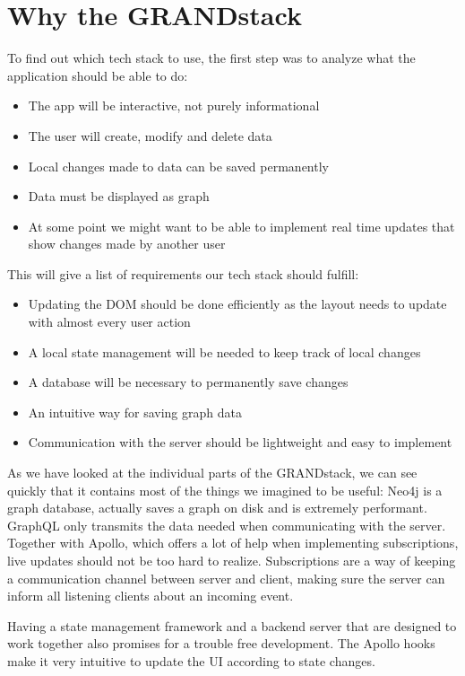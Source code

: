 \section{Why the GRANDstack}
To find out which tech stack to use, the first step was to analyze what the application should be able to do:
\begin{itemize}
\item The app will be interactive, not purely informational
\item The user will create, modify and delete data
\item Local changes made to data can be saved permanently
\item Data must be displayed as graph
\item At some point we might want to be able to implement real time updates that show changes made by another user
\end{itemize}
This will give a list of requirements our tech stack should fulfill:
\begin{itemize}
\item Updating the DOM should be done efficiently as the layout needs to update with almost every user action
\item A local state management will be needed to keep track of local changes
\item A database will be necessary to permanently save changes
\item An intuitive way for saving graph data
\item Communication with the server should be lightweight and easy to implement
\end{itemize}

As we have looked at the individual parts of the GRANDstack, we can see quickly that it contains most of the things we imagined to be useful: Neo4j is a graph database, actually saves a graph on disk and is extremely performant. GraphQL only transmits the data needed when communicating with the server. Together with Apollo, which offers a lot of help when implementing subscriptions, live updates should not be too hard to realize. Subscriptions are a way of keeping a communication channel between server and client, making sure the server can inform all listening clients about an incoming event.

Having a state management framework and a backend server that are designed to work together also promises for a trouble free development. The Apollo hooks make it very intuitive to update the UI according to state changes.

